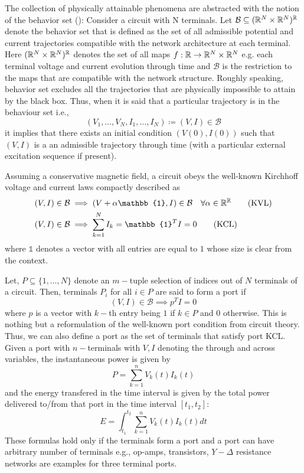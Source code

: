 The collection of physically attainable phenomena are abstracted with the notion of the behavior set (\cite{behavbook}):
Consider a circuit with N terminals. Let $\mathcal{B}\subseteq (\mathbb{R}^N\times\mathbb{R}^N)^{\mathbb{R}}$ denote the behavior set 
that is defined as the set of all admissible potential and current trajectories compatible with the network architecture 
at each terminal. Here $(\mathbb{R}^N\times\mathbb{R}^N)^{\mathbb{R}}$ denotes 
the set of all maps $f: \mathbb{R}\to\mathbb{R}^N\times\mathbb{R}^N$ e.g. each terminal voltage and current evolution through time 
and $\mathcal{B}$ is the restriction to the maps that are compatible with the network structure. Roughly speaking, behavior
set excludes all the trajectories that are physically impossible to attain by the black box. Thus, when it is said that
a particular trajectory is in the behaviour set i.e., 
\[
(V_1,\ldots,V_N,I_1,\ldots,I_N)\coloneqq (V,I) \in\mathcal{B}
\]
it implies that there exists an initial condition $(V(0),I(0))$ such that $(V,I)$ is a an admissible trajectory through time
(with a particular external excitation sequence if present).


Assuming a conservative magnetic field, a circuit obeys the well-known Kirchhoff voltage and current laws compactly described 
as 
\begin{align}
(V,I)\in\mathcal{B} &\implies (V+\alpha\mathbb{1},I)\in\mathcal{B} \quad \forall \alpha\in\Real^\Real \tag{KVL}\\
(V,I)\in\mathcal{B} &\implies \sum_{k=1}^N{I_k}=\mathbb{1}^TI=0 \tag{KCL}
\end{align}
where $\mathbb{1}$ denotes a vector with all entries are equal to $1$ whose size is clear from the context.

Let, $P \subseteq \{1,\ldots,N\}$ denote an $m-$tuple selection of indices out of $N$ terminals of a circuit. Then, terminals
$P_i$ for all $i\in P$ are said to form a port if 
\[
(V,I)\in\mathcal{B} \implies p^TI=0 \tag{Port KCL}
\]
where $p$ is a vector with $k-$th entry being $1$ if $k\in P$ and $0$ otherwise. This is nothing but a reformulation of the well-known 
port condition from circuit theory. Thus, we can also define a port as the set of terminals that satisfy port KCL. Given a port with 
$n-$terminals with $V,I$ denoting the through and across variables, the instantaneous power is given by 
\[
P = \sum_{k=1}^n{V_k(t)I_k(t)}
\]
and the energy transfered in the time interval is given by the total power delivered
to/from that port in the time interval $[t_1,t_2]$: 
\[
E = \int^{t_{2}}_{t_{1}}\sum_{k=1}^n{V_k(t)I_k(t)}dt
\]
These formulas hold only if the terminals form a port and a port can have arbitrary number of terminals 
e.g., op-amps, transistors, $Y-\Delta$ resistance networks are examples for three terminal ports. 


